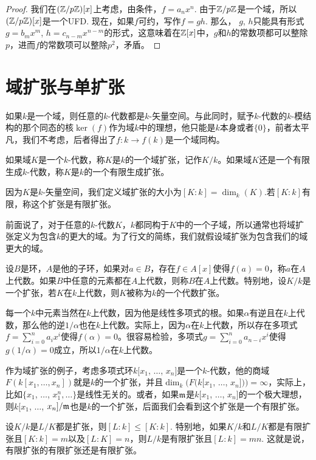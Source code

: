 \begin{proof}
	我们在$(\mathbb{Z}/p\mathbb{Z})[x]$上考虑，由条件，$f=a_nx^n$. 由于$\mathbb{Z}/p\mathbb{Z}$是一个域，所以$(\mathbb{Z}/p\mathbb{Z})[x]$是一个UFD. 现在，如果$f$可约，写作$f=gh$. 那么，
	$g$, $h$只能具有形式$g=b_m x^m$, $h=c_{n-m}x^{n-m}$的形式，这意味着在$\mathbb{Z}[x]$中，$g$和$h$的常数项都可以整除$p$，进而$f$的常数项可以整除$p^2$，矛盾。
\end{proof}

\section{域扩张与单扩张}

如果$k$是一个域，则任意的$k$-代数都是$k$-矢量空间。与此同时，赋予$k$-代数的$k$-模结构的那个同态的核$\ker(f)$作为域$k$中的理想，他只能是$k$本身或者$\{0\}$，前者太平凡，我们不考虑，后者得出了$f:k\to f(k)$是一个域同构。

\para 如果域$K$是一个$k$-代数，称$K$是$k$的一个域扩张，记作$K/k$。如果域$K$还是一个有限生成$k$-代数，称$K$是$k$的一个有限生成扩张。

因为$K$是$k$-矢量空间，我们定义域扩张的大小为$[K:k]=\dim_k(K)$.若$[K:k]$有限，称这个扩张是有限扩张。
\endpara

前面说了，对于任意的$k$-代数$K$，$k$都同构于$K$中的一个子域，所以通常也将域扩张定义为包含$k$的更大的域。为了行文的简练，我们就假设域扩张为包含我们的域更大的域。

\para 设$B$是环，$A$是他的子环，如果对$a\in B$，存在$f\in A[x]$使得$f(a)=0$，称$a$在$A$上代数。如果$B$中任意的元素都在$A$上代数，则称$B$在$A$上代数。特别地，设$K/k$是一个扩张，若$K$在$k$上代数，则$K$被称为$k$的一个代数扩张。\endpara

每一个$k$中元素当然在$k$上代数，因为他是线性多项式的根。如果$\alpha$有逆且在$k$上代数，那么他的逆$1/\alpha$也在$k$上代数。实际上，因为$\alpha$在$k$上代数，所以存在多项式$f=\sum_{i=0}^na_ix^i$使得$f(\alpha)=0$。很容易检验，多项式$g=\sum_{i=0}^na_{n-i}x^i$使得$g(1/\alpha)=0$成立，所以$1/\alpha$在$k$上代数。

作为域扩张的例子，考虑多项式环$k[x_1$, $\dots$, $x_n]$是一个$k$-代数，他的商域$F(k[x_1,\dots,x_n])$就是$k$的一个扩张，并且$\dim_k(F(k[x_1$, $\dots$, $x_n]))=\infty$，实际上，比如$\{x_1$, $\dots$, $x_1^n,\dots\}$是线性无关的。或者，如果$\mathfrak{m}$是$k[x_1$, $\dots$, $x_n]$的一个极大理想，则$k[x_1$, $\dots$, $x_n]/\mathfrak{m}$也是$k$的一个扩张，后面我们会看到这个扩张是一个有限扩张。

\begin{pro}
设$K/k$是$L/K$都是扩张，则$[L:k]\leq[K:k]$. 特别地，如果$K/k$和$L/K$都是有限扩张且$[K:k]=m$以及$[L:K]=n$，则$L/k$是有限扩张且$[L:k]=mn$. 这就是说，有限扩张的有限扩张还是有限扩张。
\end{pro}

